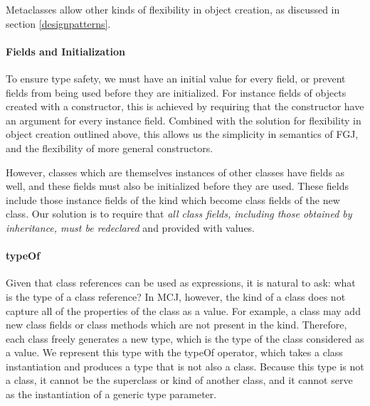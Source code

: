 \documentclass{acm-sigplan}
\begin{document}
Metaclasses allow other kinds of flexibility in object creation, as
discussed in section \ref{designpatterns}.

\paragraph{Fields and Initialization}

To ensure type safety, we must have an initial value for every field,
or prevent fields from being used before they are initialized.  For
instance fields of objects created with a constructor, this is achieved
by requiring that the constructor have an argument for every instance
field.  Combined with the solution for flexibility in object creation
outlined above, this allows us the simplicity in semantics of FGJ, and
the flexibility of more general constructors.  

However, classes which are themselves instances of other classes have
fields as well, and these fields must also be initialized before they
are used.  These fields include those instance fields of the kind
which become class fields of the new class.  Our solution is to
require that \emph{all class fields, including those obtained by
inheritance, must be redeclared} and provided with values.  




\paragraph{typeOf}

Given that class references can be used as expressions, it is natural
to ask: what is the type of a class reference?  
In MCJ, however, the kind of a class does not capture all of the
properties of the class as a value.  For example, a class may add new
class fields or class methods which are not present in the kind.
Therefore, each class freely generates a new type, which is the type
of the class considered as a value.  We represent this type with the
{\txt typeOf} operator, which takes a class instantiation and produces
a type that is not also a class.  Because this type is not a class, it
cannot be the superclass or kind of another class, and it cannot serve
as the instantiation of a generic type parameter.
\end{document}
